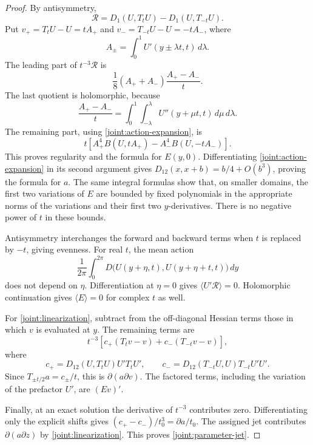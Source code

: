 \begin{proof}
By antisymmetry,
\[
 \mathcal R=D_1(U,T_tU)-D_1(U,T_{-t}U).
\]
Put \(v_+=T_tU-U=tA_+\) and \(v_-=T_{-t}U-U=-tA_-\), where
\[
 A_\pm=\int_0^1 U'(y\pm\lambda t,t)\,d\lambda.
\]
The leading part of \(t^{-3}\mathcal R\) is
\[
 \frac18(A_++A_-)\frac{A_+-A_-}{t}.
\]
The last quotient is holomorphic, because
\[
 \frac{A_+-A_-}{t}
 =\int_0^1\int_{-\lambda}^{\lambda}U''(y+\mu t,t)\,d\mu\,d\lambda.
\]
The remaining part, using \eqref{joint:action-expansion}, is
\[
 t\left[A_+^4B(U,tA_+)-A_-^4B(U,-tA_-)\right].
\]
This proves regularity and the formula for \(E(y,0)\).
Differentiating \eqref{joint:action-expansion} in its second argument gives
\(D_{12}(x,x+b)=b/4+O(b^3)\), proving the formula for \(a\).
The same integral formulas show that, on smaller domains, the first two
variations of \(E\) are bounded by fixed polynomials in the appropriate
norms of the variations and their first two \(y\)-derivatives. There is no
negative power of \(t\) in these bounds.

Antisymmetry interchanges the forward and backward terms when \(t\) is
replaced by \(-t\), giving evenness. For real \(t\), the mean action
\[
 \frac{1}{2\pi}\int_0^{2\pi}D\bigl(U(y+\eta,t),U(y+\eta+t,t)\bigr)\,dy
\]
does not depend on \(\eta\). Differentiation at \(\eta=0\) gives
\(\langle U'\mathcal R\rangle=0\). Holomorphic continuation gives
\(\langle E\rangle=0\) for complex \(t\) as well.

For \eqref{joint:linearization}, subtract from the off-diagonal Hessian
terms those in which \(v\) is evaluated at \(y\). The remaining terms are
\[
 t^{-3}\left[c_+(T_tv-v)+c_-(T_{-t}v-v)\right],
\]
where
\[
 c_+=D_{12}(U,T_tU)U'T_tU',\qquad
 c_-=D_{12}(T_{-t}U,U)T_{-t}U'U'.
\]
Since \(T_{\pm t/2}a=c_\pm/t\), this is
\(\partial(a\partial v)\). The factored terms, including the variation
of the prefactor \(U'\), are \((Ev)'\).

Finally, at an exact solution the derivative of \(t^{-3}\) contributes
zero. Differentiating only the explicit shifts gives
\((c_+-c_-)/t_0^3=\partial a/t_0\). The assigned jet contributes
\(\partial(a\partial z)\) by \eqref{joint:linearization}. This proves
\eqref{joint:parameter-jet}.
\end{proof}

